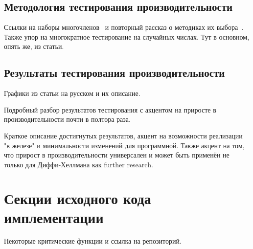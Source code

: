 \documentclass[times,specification,annotation]{itmo-student-thesis}
\begin{document}
\section{Методология тестирования производительности}\label{sec:meth}

Ссылки на наборы многочленов~\cite{rfc7296, rfc3526} и повторный рассказ о методиках их выбора~\cite{rfc2412}.
Также упор на многократное тестирование на случайных числах.
Тут в основном, опять же, из статьи.

\section{Результаты тестирования производительности}\label{sec:results}

Графики из статьи на русском и их описание.

\chapterconclusion

Подробный разбор результатов тестирования с акцентом на приросте в производительности почти в полтора раза.

\startconclusionpage

Краткое описание достигнутых результатов, акцент на возможности реализации "в железе"
и минимальности изменений для программной.
Также акцент на том, что прирост в производительности универсален и может быть применён не только для Диффи-Хеллмана
как further research.

\printmainbibliography


\appendix

\chapter{Секции исходного кода имплементации}\label{sec:app:1}

    Некоторые критические функции и ссылка на репозиторий.
\end{document}
